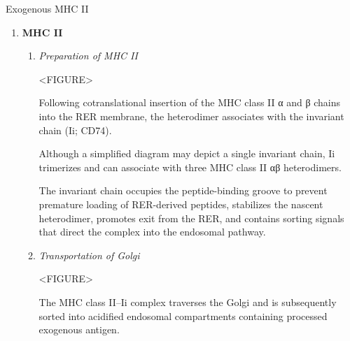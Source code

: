 \begin{core}[label=core:exogenous_mhcii]{Exogenous MHC II}
\begin{enumerate}[label=(\arabic*)]
\begin{enumerate}
\begin{itemize}
                \item Lysosomes and phagolysosomes provide the most acidic and hydrolytic environment, typically near pH 4.5--5.0.

              \end{itemize}

          \end{enumerate}

        \item \textbf{MHC II}

          \begin{enumerate}

            \item \textit{Preparation of MHC II} 

              <FIGURE>

              Following cotranslational insertion of the MHC class II α and β chains into the RER membrane, the heterodimer associates with the invariant chain (Ii; CD74).

              Although a simplified diagram may depict a single invariant chain, Ii trimerizes and can associate with three MHC class II αβ heterodimers.

              The invariant chain occupies the peptide-binding groove to prevent premature loading of RER-derived peptides, stabilizes the nascent heterodimer, promotes exit from the RER, and contains sorting signals that direct the complex into the endosomal pathway.

            \item \textit{Transportation of Golgi}

              <FIGURE>

              The MHC class II--Ii complex traverses the Golgi and is subsequently sorted into acidified endosomal compartments containing processed exogenous antigen.


\end{enumerate}
\end{enumerate}
\end{core}
